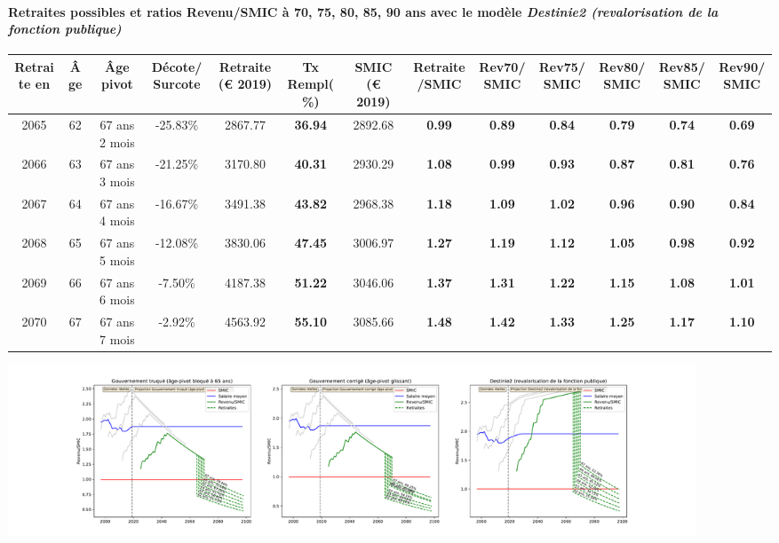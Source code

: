 \paragraph{Retraites possibles et ratios Revenu/SMIC à 70, 75, 80, 85, 90 ans avec le modèle \emph{Destinie2 (revalorisation de la fonction publique)}}  
 
{ \scriptsize \begin{center} 
\begin{tabular}[htb]{|c|c||c|c||c|c||c||c|c|c|c|c|c|} 
\hline 
 Retraite en &  Âge &  Âge pivot &  Décote/Surcote &  Retraite (\euro{} 2019) &  Tx Rempl(\%) &  SMIC (\euro{} 2019) &  Retraite/SMIC &  Rev70/SMIC &  Rev75/SMIC &  Rev80/SMIC &  Rev85/SMIC &  Rev90/SMIC \\ 
\hline \hline 
 2065 &  62 &  67 ans 2 mois &  -25.83\% &  2867.77 &  {\bf 36.94} &  2892.68 &  {\bf {\color{red} 0.99}} &  {\bf {\color{red} 0.89}} &  {\bf {\color{red} 0.84}} &  {\bf {\color{red} 0.79}} &  {\bf {\color{red} 0.74}} &  {\bf {\color{red} 0.69}} \\ 
\hline 
 2066 &  63 &  67 ans 3 mois &  -21.25\% &  3170.80 &  {\bf 40.31} &  2930.29 &  {\bf 1.08} &  {\bf {\color{red} 0.99}} &  {\bf {\color{red} 0.93}} &  {\bf {\color{red} 0.87}} &  {\bf {\color{red} 0.81}} &  {\bf {\color{red} 0.76}} \\ 
\hline 
 2067 &  64 &  67 ans 4 mois &  -16.67\% &  3491.38 &  {\bf 43.82} &  2968.38 &  {\bf 1.18} &  {\bf 1.09} &  {\bf 1.02} &  {\bf {\color{red} 0.96}} &  {\bf {\color{red} 0.90}} &  {\bf {\color{red} 0.84}} \\ 
\hline 
 2068 &  65 &  67 ans 5 mois &  -12.08\% &  3830.06 &  {\bf 47.45} &  3006.97 &  {\bf 1.27} &  {\bf 1.19} &  {\bf 1.12} &  {\bf 1.05} &  {\bf {\color{red} 0.98}} &  {\bf {\color{red} 0.92}} \\ 
\hline 
 2069 &  66 &  67 ans 6 mois &  -7.50\% &  4187.38 &  {\bf 51.22} &  3046.06 &  {\bf 1.37} &  {\bf 1.31} &  {\bf 1.22} &  {\bf 1.15} &  {\bf 1.08} &  {\bf 1.01} \\ 
\hline 
 2070 &  67 &  67 ans 7 mois &  -2.92\% &  4563.92 &  {\bf 55.10} &  3085.66 &  {\bf 1.48} &  {\bf 1.42} &  {\bf 1.33} &  {\bf 1.25} &  {\bf 1.17} &  {\bf 1.10} \\ 
\hline 
\hline 
\end{tabular} 
\end{center} } 

 \begin{center}\includegraphics[width=0.9\textwidth]{fig/ProfCertifie_2003_22_dest_retraite.pdf}\end{center} \label{fig/ProfCertifie_2003_22_dest_retraite.pdf} 

